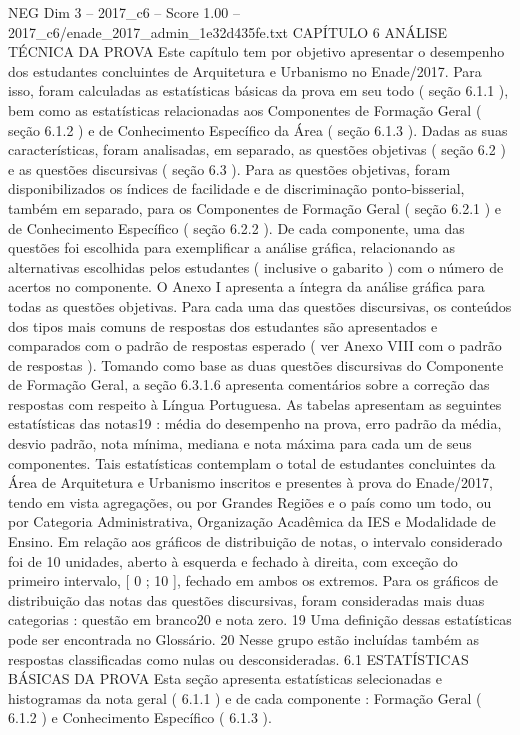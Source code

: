 \begin{textsample}{NEG Dim 3 – 2017\_c6 – Score 1.00 – 2017\_c6/enade\_2017\_admin\_1e32d435fe.txt}  \label{ex:f3_neg_087}
CAPÍTULO 6 ANÁLISE TÉCNICA DA PROVA Este capítulo tem por objetivo apresentar o desempenho dos estudantes concluintes de Arquitetura e Urbanismo no Enade/2017.
Para isso, foram calculadas as estatísticas básicas da prova em seu todo ( seção 6.1.1 ), bem como as estatísticas relacionadas aos Componentes de Formação Geral ( seção 6.1.2 ) e de Conhecimento Específico da Área ( seção 6.1.3 ).
Dadas as suas características, foram analisadas, em separado, as questões objetivas ( seção 6.2 ) e as questões discursivas ( seção 6.3 ).
Para as questões objetivas, foram disponibilizados os índices de facilidade e de discriminação ponto-bisserial, também em separado, para os Componentes de Formação Geral ( seção 6.2.1 ) e de Conhecimento Específico ( seção 6.2.2 ).
De cada componente, uma das questões foi escolhida para exemplificar a análise gráfica, relacionando as alternativas escolhidas pelos estudantes ( inclusive o gabarito ) com o número de acertos no componente.
O Anexo I apresenta a íntegra da análise gráfica para todas as questões objetivas.
Para cada uma das questões discursivas, os conteúdos dos tipos mais comuns de respostas dos estudantes são apresentados e comparados com o padrão de respostas esperado ( ver Anexo VIII com o padrão de respostas ).
Tomando como base as duas questões discursivas do Componente de Formação Geral, a seção 6.3.1.6 apresenta comentários sobre a correção das respostas com respeito à Língua Portuguesa.
As tabelas apresentam as seguintes estatísticas das notas19 : média do desempenho na prova, erro padrão da média, desvio padrão, nota mínima, mediana e nota máxima para cada um de seus componentes.
Tais estatísticas contemplam o total de estudantes concluintes da Área de Arquitetura e Urbanismo inscritos e presentes à prova do Enade/2017, tendo em vista agregações, ou por Grandes Regiões e o país como um todo, ou por Categoria Administrativa, Organização Acadêmica da IES e Modalidade de Ensino.
Em relação aos gráficos de distribuição de notas, o intervalo considerado foi de 10 unidades, aberto à esquerda e fechado à direita, com exceção do primeiro intervalo, [ 0 ; 10 ], fechado em ambos os extremos.
Para os gráficos de distribuição das notas das questões discursivas, foram consideradas mais duas categorias : questão em branco20 e nota zero. 19 Uma definição dessas estatísticas pode ser encontrada no Glossário. 20 Nesse grupo estão incluídas também as respostas classificadas como nulas ou desconsideradas. 6.1 ESTATÍSTICAS BÁSICAS DA PROVA Esta seção apresenta estatísticas selecionadas e histogramas da nota geral ( 6.1.1 ) e de cada componente : Formação Geral ( 6.1.2 ) e Conhecimento Específico ( 6.1.3 ).

\end{textsample}
